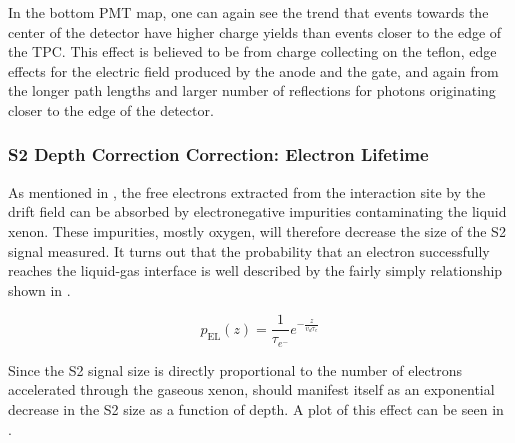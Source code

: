 In the bottom PMT map, one can again see the trend that events towards the center of the detector have higher charge yields than events closer to the edge of the TPC.  This effect is believed to be from charge collecting on the teflon, edge effects for the electric field produced by the anode and the gate, and again from the longer path lengths and larger number of reflections for photons originating closer to the edge of the detector.


\subsubsection{S2 Depth Correction Correction: Electron Lifetime}
\label{sec:xe1t_depth_correction}

As mentioned in , the free electrons extracted from the interaction site by the drift field can be absorbed by electronegative impurities contaminating the liquid xenon.  These impurities, mostly oxygen, will therefore decrease the size of the S2 signal measured.  It turns out that the probability that an electron successfully reaches the liquid-gas interface is well described by the fairly simply relationship shown in .

\begin{equation}
        \label{eqn:xe1t_electron_lifetime}
        p_{\textrm{EL}}(z) = \frac{1}{\tau_{e^-}} e^{-\frac{z}{v_d \tau_{e}}}
\end{equation} 

Since the S2 signal size is directly proportional to the number of electrons accelerated through the gaseous xenon,  should manifest itself as an exponential decrease in the S2 size as a function of depth.  A plot of this effect can be seen in .


